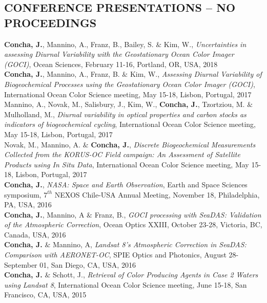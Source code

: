 \documentclass[11pt]{res} %
\begin{document}
\begin{resume}
\section{CONFERENCE PRESENTATIONS -- NO PROCEEDINGS}
\vspace{0.1in}
{\bf Concha, J.}, Mannino, A., Franz, B., Bailey, S. $\&$ Kim, W., {\it Uncertainties in assessing Diurnal Variability with the Geostationary Ocean Color Imager (GOCI)}, Ocean Sciences, February 11-16, Portland, OR, USA, 2018
\vspace{0.1in}\\
{\bf Concha, J.}, Mannino, A., Franz, B. $\&$ Kim, W., {\it Assessing Diurnal Variability of Biogeochemical Processes using the Geostationary Ocean Color Imager (GOCI)}, International Ocean Color Science meeting, May 15-18, Lisbon, Portugal, 2017
\vspace{0.1in}\\
Mannino, A., Novak, M., Salisbury, J., Kim, W., {\bf Concha, J.}, Tzortziou, M. $\&$ Mulholland, M., {\it Diurnal variability in optical properties and carbon stocks as indicators of biogeochemical cycling}, International Ocean Color Science meeting, May 15-18, Lisbon, Portugal, 2017
\vspace{0.1in}\\
Novak, M., Mannino, A. $\&$ {\bf Concha, J.}, {\it Discrete Biogeochemical Measurements Collected from the KORUS-OC Field campaign: An Assessment of Satellite Products using In Situ Data}, International Ocean Color Science meeting, May 15-18, Lisbon, Portugal, 2017
\vspace{0.1in}\\
{\bf Concha, J.}, {\it NASA: Space and Earth Observation}, Earth and Space Sciences symposium, $7^{th}$ NEXOS Chile-USA Annual Meeting, November 18, Philadelphia, PA, USA, 2016
\vspace{0.1in}\\
{\bf Concha, J.}, Mannino, A $\&$ Franz, B., {\it GOCI processing with SeaDAS: Validation of the Atmospheric Correction}, Ocean Optics XXIII, October 23-28, Victoria, BC, Canada, USA, 2016
\vspace{0.1in}\\
{\bf Concha, J.} $\&$ Mannino, A, {\it Landsat 8’s Atmospheric Correction in SeaDAS: Comparison with AERONET-OC}, SPIE Optics and Photonics,  August 28-September 01, San Diego, CA, USA, 2016
\vspace{-0.1in}\\
{\bf Concha, J.} $\&$ Schott, J., {\it Retrieval of Color Producing Agents in Case 2 Waters using Landsat 8}, International Ocean Color Science meeting, June 15-18, San Francisco, CA, USA, 2015

\end{resume}
\end{document}
